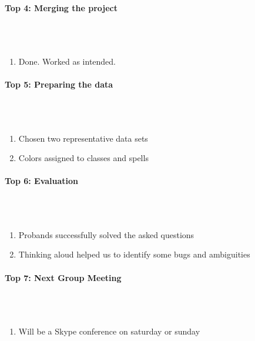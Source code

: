 \documentclass{scrartcl}
\begin{document}
\paragraph{Top 4: Merging the project}
\hfill \\ \hfill \\
\begin {enumerate}
\item Done. Worked as intended.
\end {enumerate}

\paragraph{Top 5: Preparing the data}
\hfill \\ \hfill \\
\begin {enumerate}
\item Chosen two representative data sets
\item Colors assigned to classes and spells
\end {enumerate}

\paragraph{Top 6: Evaluation}
\hfill \\ \hfill \\
\begin {enumerate}
\item Probands successfully solved the asked questions
\item Thinking aloud helped us to identify some bugs and ambiguities
\end {enumerate}

\paragraph{Top 7: Next Group Meeting}
\hfill \\ \hfill \\
\begin {enumerate}
\item Will be a Skype conference on saturday or sunday
\end {enumerate}
\end{document}
